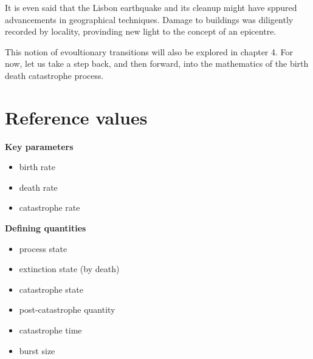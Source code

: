 It is even said that the Lisbon earthquake and its cleanup might have sppured advancements in geographical techniques. Damage to buildings 
was diligently recorded by locality, provinding new light to the concept of an epicentre.\par
This notion of evoultionary transitions will also be explored in chapter 4. For now, let us take a step back, and then forward, into the mathematics of the birth death catastrophe process.























\section{Reference values}




\newcommand\indentA{3cm}

\noindent
\textbf{Key parameters}
\begin{itemize}[leftmargin=\indentA]
\item[$\lambda$ :]birth rate 
\item[$\mu$: ]death rate
\item[$\delta$ :]catastrophe rate
\end{itemize}

\noindent
\textbf{Defining quantities}
\begin{itemize}[leftmargin=\indentA]
\item[$\xt$ :]process state
\item[$\xt=0$ :]extinction state (by death)
\item[$\xt=H$ :]catastrophe state
\item[$\wt$ :]post-catastrophe quantity
\item[$\tau$ :] catastrophe time
\item[$\mathcal{K}$ :]burst size
\end{itemize}

